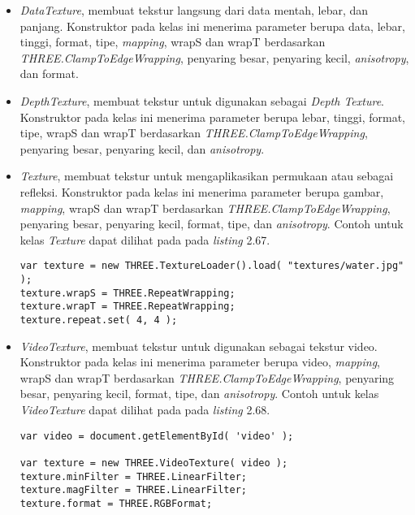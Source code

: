 \begin{itemize}
\begin{itemize}
	\item{\it DataTexture}, membuat tekstur langsung dari data mentah, lebar, dan panjang. Konstruktor pada kelas ini menerima parameter berupa data, lebar, tinggi, format, tipe, {\it mapping}, wrapS dan wrapT berdasarkan {\it THREE.ClampToEdgeWrapping}, penyaring besar, penyaring kecil, {\it anisotropy}, dan format.
	\item{\it DepthTexture}, membuat tekstur untuk digunakan sebagai {\it Depth Texture}. Konstruktor pada kelas ini menerima parameter berupa lebar, tinggi, format, tipe, wrapS dan wrapT berdasarkan {\it THREE.ClampToEdgeWrapping}, penyaring besar, penyaring kecil, dan {\it anisotropy}.
	\item {\it Texture}, membuat tekstur untuk mengaplikasikan permukaan atau sebagai refleksi. Konstruktor pada kelas ini menerima parameter berupa gambar, {\it mapping},  wrapS dan wrapT berdasarkan {\it THREE.ClampToEdgeWrapping}, penyaring besar, penyaring kecil, format, tipe, dan {\it anisotropy}. Contoh untuk kelas {\it Texture} dapat dilihat pada pada {\it listing} 2.67.
	
\begin{lstlisting}[caption={Contoh penggunaan kelas {\it Texture}.},captionpos=b]
var texture = new THREE.TextureLoader().load( "textures/water.jpg" );
texture.wrapS = THREE.RepeatWrapping;
texture.wrapT = THREE.RepeatWrapping;
texture.repeat.set( 4, 4 );
\end{lstlisting}
	
	\item{\it VideoTexture}, membuat tekstur untuk digunakan sebagai tekstur video. Konstruktor pada kelas ini menerima parameter berupa video, {\it mapping},  wrapS dan wrapT berdasarkan {\it THREE.ClampToEdgeWrapping}, penyaring besar, penyaring kecil, format, tipe, dan {\it anisotropy}. Contoh untuk kelas {\it VideoTexture} dapat dilihat pada pada {\it listing} 2.68.
	
\begin{lstlisting}[caption={Contoh penggunaan kelas {\it VideoTexture}.},captionpos=b]
var video = document.getElementById( 'video' );

var texture = new THREE.VideoTexture( video );
texture.minFilter = THREE.LinearFilter;
texture.magFilter = THREE.LinearFilter;
texture.format = THREE.RGBFormat;
\end{lstlisting}
	
	\end{itemize}	
	
\end{itemize}
 
